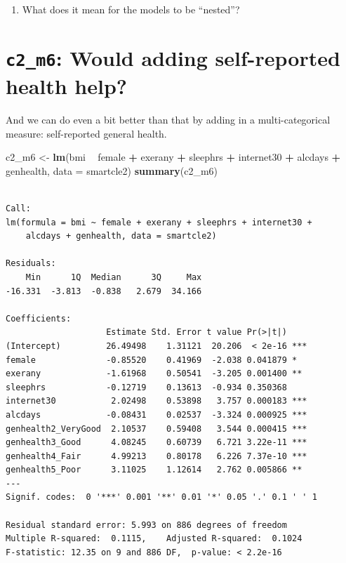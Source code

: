 \documentclass[]{book}
\newenvironment{Shaded}{\begin{snugshade}}{\end{snugshade}}
\newcommand{\KeywordTok}[1]{\textcolor[rgb]{0.13,0.29,0.53}{\textbf{#1}}}
\newcommand{\DataTypeTok}[1]{\textcolor[rgb]{0.13,0.29,0.53}{#1}}
\newcommand{\StringTok}[1]{\textcolor[rgb]{0.31,0.60,0.02}{#1}}
\newcommand{\OperatorTok}[1]{\textcolor[rgb]{0.81,0.36,0.00}{\textbf{#1}}}
\newcommand{\NormalTok}[1]{#1}
\providecommand{\tightlist}{%
  \setlength{\itemsep}{0pt}\setlength{\parskip}{0pt}}
\theoremstyle{definition}
\theoremstyle{definition}
\theoremstyle{definition}
\theoremstyle{remark}
\begin{document}
\begin{enumerate}
\def\labelenumi{\arabic{enumi}.}
\setcounter{enumi}{3}
\tightlist
\item
  What does it mean for the models to be ``nested''?
\end{enumerate}

\section{\texorpdfstring{\texttt{c2\_m6}: Would adding self-reported
health
help?}{c2\_m6: Would adding self-reported health help?}}\label{c2_m6-would-adding-self-reported-health-help}

And we can do even a bit better than that by adding in a
multi-categorical measure: self-reported general health.

\begin{Shaded}
\begin{Highlighting}[]
\NormalTok{c2_m6 <-}\StringTok{ }\KeywordTok{lm}\NormalTok{(bmi }\OperatorTok{~}\StringTok{ }\NormalTok{female }\OperatorTok{+}\StringTok{ }\NormalTok{exerany }\OperatorTok{+}\StringTok{ }\NormalTok{sleephrs }\OperatorTok{+}\StringTok{ }\NormalTok{internet30 }\OperatorTok{+}\StringTok{ }\NormalTok{alcdays }\OperatorTok{+}\StringTok{ }\NormalTok{genhealth,}
         \DataTypeTok{data =}\NormalTok{ smartcle2)}
\KeywordTok{summary}\NormalTok{(c2_m6)}
\end{Highlighting}
\end{Shaded}

\begin{verbatim}

Call:
lm(formula = bmi ~ female + exerany + sleephrs + internet30 + 
    alcdays + genhealth, data = smartcle2)

Residuals:
    Min      1Q  Median      3Q     Max 
-16.331  -3.813  -0.838   2.679  34.166 

Coefficients:
                    Estimate Std. Error t value Pr(>|t|)    
(Intercept)         26.49498    1.31121  20.206  < 2e-16 ***
female              -0.85520    0.41969  -2.038 0.041879 *  
exerany             -1.61968    0.50541  -3.205 0.001400 ** 
sleephrs            -0.12719    0.13613  -0.934 0.350368    
internet30           2.02498    0.53898   3.757 0.000183 ***
alcdays             -0.08431    0.02537  -3.324 0.000925 ***
genhealth2_VeryGood  2.10537    0.59408   3.544 0.000415 ***
genhealth3_Good      4.08245    0.60739   6.721 3.22e-11 ***
genhealth4_Fair      4.99213    0.80178   6.226 7.37e-10 ***
genhealth5_Poor      3.11025    1.12614   2.762 0.005866 ** 
---
Signif. codes:  0 '***' 0.001 '**' 0.01 '*' 0.05 '.' 0.1 ' ' 1

Residual standard error: 5.993 on 886 degrees of freedom
Multiple R-squared:  0.1115,    Adjusted R-squared:  0.1024 
F-statistic: 12.35 on 9 and 886 DF,  p-value: < 2.2e-16
\end{verbatim}
\end{document}
